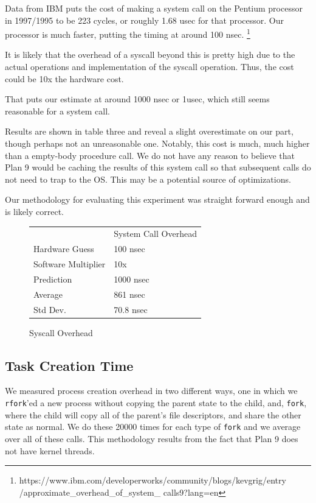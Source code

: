 \documentclass[letterpaper,twocolumn,10pt]{article}
\begin{document}
Data from IBM puts the cost of making a system call on the Pentium processor in 1997/1995
to be 223 cycles, or roughly 1.68 usec for that processor. Our processor is much faster,
putting the timing at around 100 nsec.
\footnote{https://www.ibm.com/developerworks/community/blogs/kevgrig/entry 
/approximate\_overhead\_of\_system\_ calls9?lang=en}

It is likely that the overhead of a syscall beyond this is pretty high due to
the actual operations and implementation of the syscall operation. Thus, the
cost could be 10x the hardware cost.

That puts our estimate at around 1000 nsec or 1usec, which still seems reasonable for a system call.

Results are shown in table three and reveal a slight overestimate on our part, though perhaps not an 
unreasonable one. Notably, this cost is much, much higher than a empty-body procedure call. We do not
have any reason to believe that Plan 9 would be caching the results of this system call so that subsequent
calls do not need to trap to the OS. This may be a potential source of optimizations.

Our methodology for evaluating this experiment was straight forward enough and is likely correct.

\begin{figure}
	\centering
    \begin{tabular}{ll}
            & System Call Overhead \\
    Hardware Guess  & 100 nsec  \\
    Software Multiplier  & 10x \\  
    Prediction  & 1000 nsec \\
    Average  & 861 nsec\\
    Std Dev. & 70.8 nsec          
    \end{tabular}
\caption{Syscall Overhead}
\label{tab:syscalloverheads}
\end{figure}

\subsection{Task Creation Time}

We measured process creation overhead in two different ways, one in which we
\texttt{rfork}'ed a new process without copying the parent state to the child,
and, \texttt{fork}, where the child will copy all of the parent's file
descriptors, and share the other state as normal. We do these 20000 times for
each type of \texttt{fork} and we average over all of these calls. This methodology
results from the fact that Plan 9 does not have kernel threads.
\end{document}
